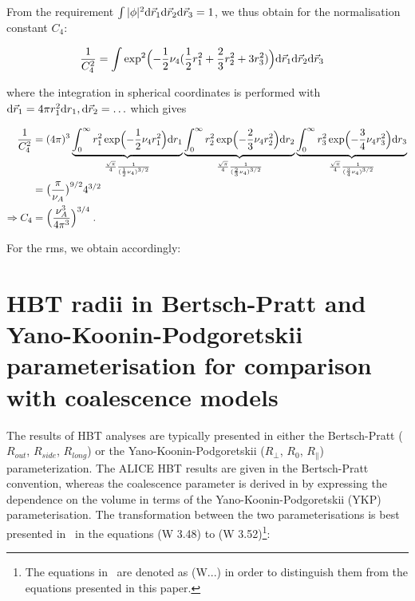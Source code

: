 \documentclass[a4paper,11pt]{scrartcl} %
\begin{document}
\begin{appendix}
\noindent From the requirement $\int|\phi|^2{\rm d}\vec{r}_{1}{\rm d}\vec{r}_{2}{\rm d}\vec{r}_{3} = 1$, we thus obtain for the normalisation constant $C_4$: 

\begin{align}
	{1\over C_{4}^{2}} &= \int \exp^{2}\Bigl(-{1\over 2} \nu_{4} ({1\over 2}r_{1}^{2} + {2\over 3} r_{2}^{2} + 3r_{3}^{2}) \Bigr) {\rm d}\vec{r}_{1}{\rm d}\vec{r}_{2}{\rm d}\vec{r}_{3}
\end{align}

\noindent where the integration in spherical coordinates is performed with ${\rm d}\vec{r}_{1} = 4\pi r_{1}^{2}{\rm d}r_{1},  {\rm d}\vec{r}_{2} = \ldots$ which gives

\begin{align}
	{1\over C_{4}^{2}} &= (4\pi)^{3} \underbrace{\int_{0}^{\infty} r_{1}^{2}\exp\Bigl(-{1\over 2} \nu_{4}  r_{1}^{2}  \Bigr)  {\rm d}r_{1}}_{{\sqrt{\pi} \over 4} {1 \over ({1\over 2} \nu_{4})^{3/2}}  }
							\underbrace{\int_{0}^{\infty} r_{2}^{2}\exp\Bigl(-{2\over 3} \nu_{4}  r_{2}^{2}  \Bigr)  {\rm d}r_{2}}_{{\sqrt{\pi} \over 4} {1 \over ({2\over 3} \nu_{4})^{3/2}}  }
							\underbrace{\int_{0}^{\infty} r_{3}^{2}\exp\Bigl(-{3\over 4} \nu_{4}  r_{3}^{2}  \Bigr)  {\rm d}r_{3}}_{{\sqrt{\pi} \over 4} {1 \over ({3\over 4} \nu_{4})^{3/2}}  } \\
		&= \bigl({\pi \over \nu_{A}}\bigr)^{9/2} 4^{3/2} \\
	\Rightarrow C_{4} &= \Bigl({\nu_{A}^{3} \over 4 \pi^{3}}\Bigr)^{3/4} \;.
\end{align}

\noindent For the rms, we obtain accordingly:





%
%
\section{HBT radii in Bertsch-Pratt and Yano-Koonin-Podgoretskii parameterisation for comparison with coalescence models}\label{appendix:YKP}

The results of HBT analyses are typically presented in either the Bertsch-Pratt ($R_{out}$, $R_{side}$, $R_{long}$) or the Yano-Koonin-Podgoretskii ($R_{\perp}$, $R_{0}$, $R_{\parallel}$) parameterization. The ALICE HBT results \cite{Aamodt:2011mr, Adam:2015vna} are given in the Bertsch-Pratt convention, whereas the coalescence parameter is derived in \cite{Scheibl:1998tk} by expressing the dependence on the volume in terms of the Yano-Koonin-Podgoretskii (YKP) parameterisation. 
The transformation between the two parameterisations is best presented in~\cite{Wiedemann:1999qn} in the equations (W 3.48) to (W 3.52)\footnote{The equations in~\cite{Wiedemann:1999qn} are denoted as (W...) in order to distinguish them from the equations presented in this paper.}:


\end{appendix}
\end{document}
